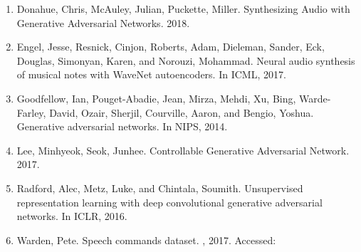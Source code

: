 \documentclass[titlepage]{article}
\begin{document}
\begin{enumerate}

\item
  Donahue, Chris, McAuley, Julian, Puckette, Miller. Synthesizing Audio with Generative Adversarial Networks. 2018.
\item
  Engel, Jesse, Resnick, Cinjon, Roberts, Adam, Dieleman, Sander, Eck, Douglas, Simonyan, Karen, and Norouzi, Mohammad. Neural audio synthesis of musical notes with WaveNet autoencoders. In ICML, 2017.
\item
  Goodfellow, Ian, Pouget-Abadie, Jean, Mirza, Mehdi, Xu, Bing, Warde-Farley, David, Ozair, Sherjil, Courville, Aaron, and Bengio, Yoshua. Generative adversarial networks. In NIPS, 2014.
\item
  Lee, Minhyeok, Seok, Junhee. Controllable Generative Adversarial Network. 2017.
\item
  Radford, Alec, Metz, Luke, and Chintala, Soumith. Unsupervised representation learning with deep convolutional generative adversarial networks. In ICLR, 2016.
\item
  Warden, Pete. Speech commands dataset.
, 2017.
Accessed:

\end{enumerate}

\end{document}
